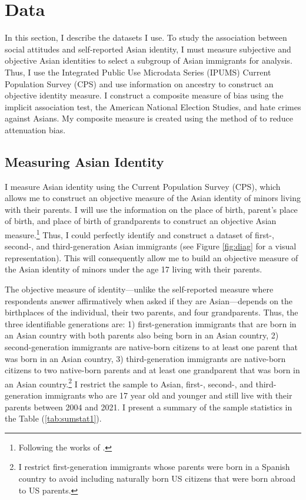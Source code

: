 \section{Data}\label{sec:data}

In this section, I describe the datasets I use. To study the association between social attitudes and self-reported Asian identity, I must measure subjective and objective Asian identities to select a subgroup of Asian immigrants for analysis. Thus, I use the Integrated Public Use Microdata Series (IPUMS) Current Population Survey (CPS) \autocite{floodsarahIntegratedPublicUse2021a} and use information on ancestry to construct an objective identity measure. I construct a composite measure of bias using the implicit association test, the American National Election Studies, and hate crimes against Asians. My composite measure is created using the method of \textcite{lubotskyInterpretationRegressionsMultiple2006} to reduce attenuation bias. 


\subsection{Measuring Asian Identity}\label{subsec:cps}

I measure Asian identity using the Current Population Survey (CPS), which allows me to construct an objective measure of the Asian identity of minors living with their parents. I will use the information on the place of birth, parent's place of birth, and place of birth of grandparents to construct an objective Asian measure.\footnote{Following the works of \textcite{antmanEthnicAttritionObserved2016,antmanEthnicAttritionAssimilation2020}.} Thus, I could perfectly identify and construct a dataset of first-, second-, and third-generation Asian immigrants (see Figure \ref{fig:diag} for a visual representation). This will consequently allow me to build an objective measure of the Asian identity of minors under the age 17 living with their parents. 

The objective measure of identity---unlike the self-reported measure where respondents answer affirmatively when asked if they are Asian---depends on the birthplaces of the individual, their two parents, and four grandparents. Thus, the three identifiable generations are: 1) first-generation immigrants that are born in an Asian country with both parents also being born in an Asian country, 2) second-generation immigrants are native-born citizens to at least one parent that was born in an Asian country, 3) third-generation immigrants are native-born citizens to two native-born parents and at least one grandparent that was born in an Asian country.\footnote{I restrict first-generation immigrants whose parents were born in a Spanish country to avoid including naturally born US citizens that were born abroad to US parents.} I restrict the sample to Asian, first-, second-, and third-generation immigrants who are 17 year old and younger and still live with their parents between 2004 and 2021. I present a summary of the sample statistics in the Table (\ref{tab:sumstat1}). 

